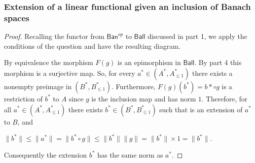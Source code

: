 \documentclass{article}
\begin{document}
\subsubsection{Extension of a linear functional given an inclusion of Banach spaces}

\begin{proof}
	
	Recalling the functor from $\textsf{Ban}^{op}$ to $\textsf{Ball}$ discussed in part 1, we apply the conditions of the question and have the resulting diagram.
	
	\begin{center}
	\end{center}
	
	\noindent By equivalence the morphism $F(g)$ is an epimorphism in $\textsf{Ball}$.
	By part 4 this morphism is a surjective map.
	So, for every $a^* \in (A^*,A^*_{\leq1})$ there exists a nonempty preimage in $(B^*,B^*_{\leq1})$.
	Furthermore, $F(g)(b^*)=b*\circ{g}$ is a restriction of $b^*$ to $A$ since $g$ is the inclusion map and has norm $1$.
	Therefore, for all $a^*\in (A^*,A^*_{\leq1})$ there exists $b^*\in (B^*,B^*_{\leq1})$ such that is an extension of $a^*$ to $B$, and
	\begin{center}
		$\|b^*\|\leq\|a^*\|=\|b^*\circ{g}\|\leq \|b^*\|\|g\|=\|b^*\|\times 1=\|b^*\|$.
	\end{center}
	Consequently the extension $b^*$ has the same norm as $a^*$.
	
\end{proof}
\end{document}
